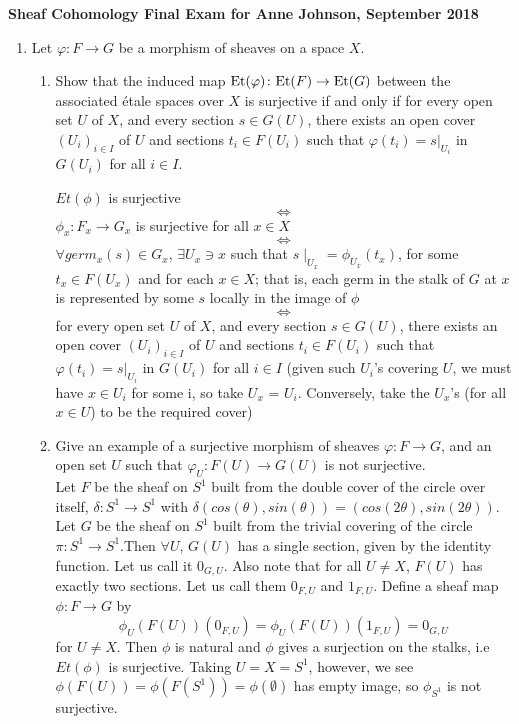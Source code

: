 \documentclass{article}
\newcommand{\Et}{\mbox{\rm Et}}
\begin{document}
\begin{center}
{\bf Sheaf Cohomology Final Exam for Anne Johnson, September 2018}
\end{center}

\begin{enumerate}
\item
Let $\varphi\colon F\to G$ be a morphism of sheaves on a space $X$.
\begin{enumerate}
 \item Show that the induced map $\Et(\varphi)\colon\Et(F)\to\Et(G)$ between the associated 
\'etale spaces over $X$ is surjective if and only if for every open set $U$ of $X$, and every section $s\in G(U)$,
there exists an open cover $(U_i)_{i\in I}$ of $U$ and sections $t_i\in F(U_i)$ such that $\varphi(t_i)=s|_{U_i}$ in $G(U_i)$ for all $i\in I$.\\

\begin{center}
$Et(\phi)$ is surjective \[ \iff \] $\phi_x: F_x \rightarrow G_x$ is surjective for all $x \in X$ \[\iff\] $\forall germ_x(s) \in G_x$, $\exists U_x \ni x$ such that $s\mid_{U_x} = \phi_{U_x}(t_x)$, for some $t_x \in F(U_x)$ and for each $x \in X$; that is, each germ in the stalk of $G$ at $x$ is represented by some $s$ locally in the image of $\phi$ \[\iff\]  for every open set $U$ of $X$, and every section $s\in G(U)$,
there exists an open cover $(U_i)_{i\in I}$ of $U$ and sections $t_i\in F(U_i)$ such that $\varphi(t_i)=s|_{U_i}$ in $G(U_i)$ for all $i\in I$ (given such $U_i$'s covering $U$, we must have $x \in U_i$ for some i, so  take $U_x$ = $U_i$. Conversely, take the $U_x$'s (for all $x \in U$) to be the required cover)
\end{center}

\newpage
\item Give an example of a surjective morphism of sheaves $\varphi\colon F\to G$, and an open set $U$ such that $\varphi_U\colon F(U)\to G(U)$ is not surjective.\\

Let $F$ be the sheaf on $S^1$ built from the double cover of the circle over itself, $\delta: S^1 \rightarrow S^1$ with $\delta(cos(\theta), sin(\theta)) = (cos(2\theta), sin(2\theta))$. Let $G$ be the sheaf on $S^1$ built from the trivial covering of the circle  $\pi: S^1 \rightarrow S^1$.Then $\forall U$, $G(U)$ has a single section, given by the identity function. Let us call it $0_{G,U}$.  Also note that for all $U \neq X$, $F(U)$ has exactly two sections. Let us call them $0_{F,U}$ and $1_{F,U}$.  Define a sheaf map $\phi: F \rightarrow G$ by \[\phi_U(F(U))(0_{F,U}) = \phi_U(F(U))(1_{F,U}) = 0_{G,U}\] for $U \neq X$. Then $\phi$ is natural and $\phi$ gives a surjection on the stalks, i.e $Et(\phi)$ is surjective. Taking $U=X=S^1$, however, we see $\phi(F(U))=\phi(F(S^1))=\phi(\emptyset)$ has empty image, so $\phi_{S^1}$ is not surjective.



\end{enumerate}
\end{enumerate}
\end{document}

